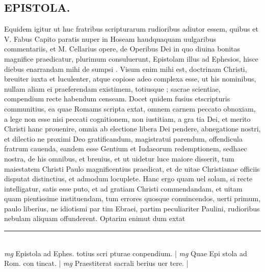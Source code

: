 \documentclass{article}
\begin{document}
\begin{pages}
\section*{EPISTOLA.  }\pstart Equidem igitur ut huc fratribus scripturarum rudioribus   adiutor essem, quibus et V. Fabus  Capito paratis nuper in Hoseam haudquaquam uulgaribus commentariis, et M.  Cellarius opere, de Operibus Dei in quo diuina bonitas magnifice praedicatur, plurimum consuluerunt, Epistolam illus ad Ephesios, hisce diebus enarrandam mihi de sumpsi .  Visum enim mihi est, doctrinam Christi, breuiter iuxta et luculenter, atque  copiose adeo complexa esse, ut his nominibus, nullam aliam ei praeferendam existimem, totiusque ; sacrae scientiae, compendium recte habendum censeam.   \pend\pstart Docet quidem fusius etscripturis communitius, ea quae Romams scripta extat, omnem carnem peccato obnoxiam, a lege non esse nisi peccati cognitionem, non iustitiam, a gra tia Dei, et merito Christi hanc prouenire, omnia ab electione libera Dei pendere, abnegatione nostri, et dilectio ne proximi Deo gratificandum, magistratui parendum, offendicula fratrum cauenda, eandem esse Gentium et Iudaeorum redemptionem, sedhaec nostra, de his omnibus, et breuius, et ut uidetur luce maiore disserit, tum maiestatem Christi Paulo magnificentius praedicat, et de uitae Christianae officiis disputat distinctius, et admodum locuplete.   \pend\pstart Hanc ergo quam uel solam, si recte intelligatur, satis esse puto, et ad gratiam Christi commendandam, et uitam quam pientissime instituendam, tum errores quosque  conuincendos, uerti primum, paulo liberius, ne idiotismi par tim Ebraei, partim peculiariter Paulini, rudioribus nebulam aliquam offunderent. Optarim enimut dum extat  \pend
\vspace{0.5cm}\noindent
\vspace{0.2cm}\rule{1cm}{0.2pt}\\ 
\hspace{0.2cm}\textit{mg}
\footnotesize Epistola ad Ephes.  totius scri pturae conpendium.  
\normalsize| 
\hspace{0.2cm}\textit{mg}
\footnotesize Quae Epi stola ad Rom.  con tincat.  
\normalsize| 
\hspace{0.2cm}\textit{mg}
\footnotesize Praestiterat sacrali berius uer tere.  
\normalsize| 

\end{pages}
\end{document}
